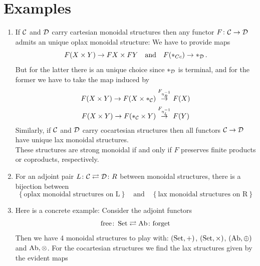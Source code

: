     \section{Examples}
        \begin{enumerate}[label=\roman*)]
            \item 
                If $\mathcal{C}$ and $\mathcal{D}$ carry cartesian monoidal structures then any functor $F \colon \mathcal{C} \to \mathcal{D}$ admits an unique oplax monoidal structure: We have to provide maps
                \begin{equation*}
                    F(X \times Y) \to FX \times FY \quad \text{and} \quad F(*_{Cc}) \to *_{\mathcal{D}} \,. 
                \end{equation*}
                But for the latter there is an unique choice since $*_{\mathcal{D}}$ is terminal, and for the former we have to take the map induced by
                \begin{gather*}
                    F(X \times Y) \to F(X \times *_{\mathcal{C}}) \overset{F_{\eta^{-1}_R}}{\rightarrow} F(X) \\
                    F(X \times Y) \to F(*_{\mathcal{C}} \times Y) \overset{F_{\eta^{-1}_L}}{\rightarrow} F(Y)
                \end{gather*}
                Similarly, if $\mathcal{C}$ and $\mathcal{D}$ carry cocartesian structures then all functors $\mathcal{C} \to \mathcal{D}$ have unique lax monoidal structures. \\
                These structures are strong monoidal if and only if $F$ preserves finite products or coproducts, respectively.\label{chIV-6-i}
            \item 
                For an adjoint pair $L \colon \mathcal{C} \rightleftarrows \mathcal{D} \colon R$ between monoidal structures, there is a bijection between
                \begin{equation*}
                    \left\{ \text{oplax monoidal structures on L} \right\} \quad \text{and} \quad \left\{ \text{lax monoidal structures on R} \right\}
                \end{equation*}\label{chIV-6-ii}
            \item 
                Here is a concrete example: Consider the adjoint functors
                \begin{equation*}
                    \text{free} \colon \operatorname{Set} \rightleftarrows \operatorname{Ab} \colon \text{forget}
                \end{equation*}
                Then we have 4 monoidal structures to play with: $(\operatorname{Set}, +)$, $(\operatorname{Set}, \times)$, $(\operatorname{Ab}, \oplus)$ and $\operatorname{Ab}, \otimes$. For the cocartesian structures we find the lax structures given by the evident maps

\end{enumerate}
